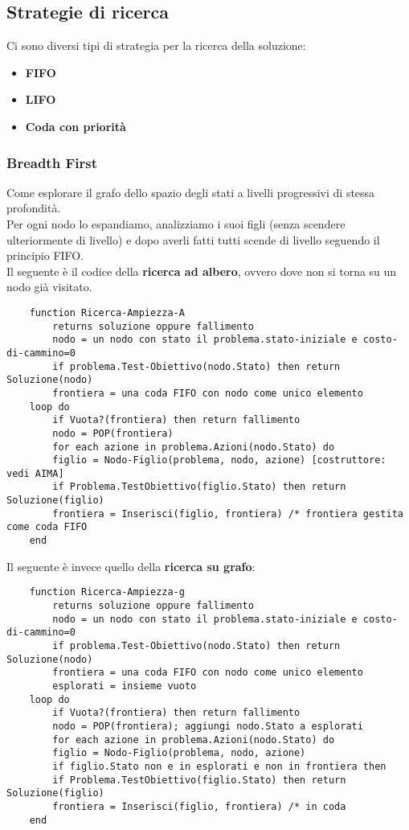 \subsection{Strategie di ricerca}
Ci sono diversi tipi di strategia per la ricerca della soluzione:
\begin{itemize}
	\item \textbf{FIFO}
	\item \textbf{LIFO}
	\item \textbf{Coda con priorità}
\end{itemize}


\subsubsection{Breadth First}
Come esplorare il grafo dello spazio degli stati a livelli progressivi di stessa profondità.\\
Per ogni nodo lo espandiamo, analizziamo i suoi figli (senza scendere ulteriormente di livello) e dopo averli fatti tutti scende di livello seguendo il principio FIFO.\\
Il seguente è il codice della \textbf{ricerca ad albero}, ovvero dove non si torna su un nodo già visitato.

\begin{lstlisting}
	function Ricerca-Ampiezza-A
		returns soluzione oppure fallimento
		nodo = un nodo con stato il problema.stato-iniziale e costo-di-cammino=0
		if problema.Test-Obiettivo(nodo.Stato) then return Soluzione(nodo)
		frontiera = una coda FIFO con nodo come unico elemento
	loop do
		if Vuota?(frontiera) then return fallimento
		nodo = POP(frontiera)
		for each azione in problema.Azioni(nodo.Stato) do
		figlio = Nodo-Figlio(problema, nodo, azione) [costruttore: vedi AIMA]
		if Problema.TestObiettivo(figlio.Stato) then return Soluzione(figlio)
		frontiera = Inserisci(figlio, frontiera) /* frontiera gestita come coda FIFO
	end
\end{lstlisting}

Il seguente è invece quello della \textbf{ricerca su grafo}:
\begin{lstlisting}
	function Ricerca-Ampiezza-g
		returns soluzione oppure fallimento
		nodo = un nodo con stato il problema.stato-iniziale e costo-di-cammino=0
		if problema.Test-Obiettivo(nodo.Stato) then return Soluzione(nodo)
		frontiera = una coda FIFO con nodo come unico elemento
		esplorati = insieme vuoto
	loop do
		if Vuota?(frontiera) then return fallimento
		nodo = POP(frontiera); aggiungi nodo.Stato a esplorati
		for each azione in problema.Azioni(nodo.Stato) do
		figlio = Nodo-Figlio(problema, nodo, azione)
		if figlio.Stato non e in esplorati e non in frontiera then
		if Problema.TestObiettivo(figlio.Stato) then return Soluzione(figlio)
		frontiera = Inserisci(figlio, frontiera) /* in coda
	end
\end{lstlisting}

